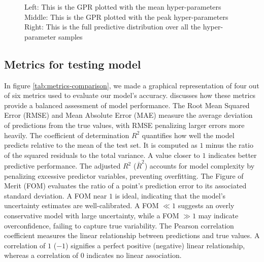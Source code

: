 \documentclass{article}
\begin{document}
\begin{figure}[H]
\begin{subfigure}[b]{0.3\textwidth}
    \end{subfigure}
    \caption{
        Left: This is the GPR plotted with the mean hyper-parameters
        Middle: This is the GPR plotted with the peak hyper-parameters
        Right: This is the full predictive distribution over all the hyper-parameter samples
     }
\end{figure}



\subsection{Metrics for testing model}


In figure \ref{tab:metrics-comparison}, we made a graphical representation of four out of six metrics used to evaluate our model’s accuracy. \cite{rasmussen2006gaussian} discusses how these metrics provide a balanced assessment of model performance.
The Root Mean Squared Error (RMSE) and Mean Absolute Error (MAE) measure the average deviation of predictions from the true values, with RMSE penalizing larger errors more heavily.
The coefficient of determination \( R^2 \) quantifies how well the model predicts relative to the mean of the test set. It is computed as \( 1 \) minus the ratio of the squared residuals to the total variance. A value closer to \( 1 \) indicates better predictive performance.
The adjusted \( R^2 \) (\(\bar{R}^2\)) accounts for model complexity by penalizing excessive predictor variables, preventing overfitting.
The Figure of Merit (FOM) evaluates the ratio of a point’s prediction error to its associated standard deviation. A FOM near \( 1 \) is ideal, indicating that the model’s uncertainty estimates are well-calibrated. A FOM \( \ll 1 \) suggests an overly conservative model with large uncertainty, while a FOM \( \gg 1 \) may indicate overconfidence, failing to capture true variability.
The Pearson correlation coefficient measures the linear relationship between predictions and true values. A correlation of \( 1 \) (\(-1\)) signifies a perfect positive (negative) linear relationship, whereas a correlation of \( 0 \) indicates no linear association.
\end{document}
